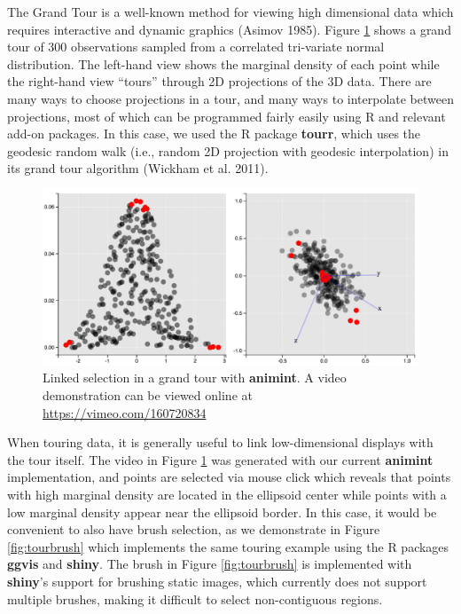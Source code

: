 \documentclass[12pt,]{article}
\theoremstyle{definition}
\theoremstyle{definition}
\theoremstyle{definition}
\theoremstyle{remark}
\begin{document}
The Grand Tour is a well-known method for viewing high dimensional data
which requires interactive and dynamic graphics (Asimov 1985). Figure
\ref{fig:tour} shows a grand tour of 300 observations sampled from a
correlated tri-variate normal distribution. The left-hand view shows the
marginal density of each point while the right-hand view ``tours''
through 2D projections of the 3D data. There are many ways to choose
projections in a tour, and many ways to interpolate between projections,
most of which can be programmed fairly easily using R and relevant
add-on packages. In this case, we used the R package \textbf{tourr},
which uses the geodesic random walk (i.e., random 2D projection with
geodesic interpolation) in its grand tour algorithm (Wickham et al.
2011).

\begin{figure}
\centering
\includegraphics{images/tour}
\caption{\label{fig:tour}Linked selection in a grand tour with
\textbf{animint}. A video demonstration can be viewed online at
\url{https://vimeo.com/160720834}}
\end{figure}

When touring data, it is generally useful to link low-dimensional
displays with the tour itself. The video in Figure \ref{fig:tour} was
generated with our current \textbf{animint} implementation, and points
are selected via mouse click which reveals that points with high
marginal density are located in the ellipsoid center while points with a
low marginal density appear near the ellipsoid border. In this case, it
would be convenient to also have brush selection, as we demonstrate in
Figure \ref{fig:tourbrush} which implements the same touring example
using the R packages \textbf{ggvis} and \textbf{shiny}. The brush in
Figure \ref{fig:tourbrush} is implemented with \textbf{shiny}'s support
for brushing static images, which currently does not support multiple
brushes, making it difficult to select non-contiguous regions.
\end{document}
